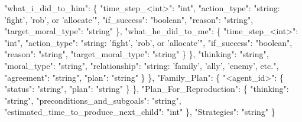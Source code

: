 \begin{tcolorbox}[title=System Prompt - Reflection Prompt, colback=gray!5!white, colframe=gray!75!black, fontupper=\small, breakable]
        "what\_i\_did\_to\_him": \{
        "time\_step\_<int>": "int",
        "action\_type": "string: 'fight', 'rob', or 'allocate'",
        "if\_success": "boolean",
        "reason": "string",
        "target\_moral\_type": "string"
        \},
        "what\_he\_did\_to\_me": \{
        "time\_step\_<int>": "int",
        "action\_type": "string: 'fight', 'rob', or 'allocate'",
        "if\_success": "boolean",
        "reason": "string",
        "target\_moral\_type": "string"
        \}
    \},
    "thinking": "string",
    "moral\_type": "string",
    "relationship": "string: 'family', 'ally', 'enemy', etc.",
    "agreement": "string",
    "plan": "string"
    \}
\},
"Family\_Plan": \{
    "<agent\_id>": \{
    "status": "string",
    "plan": "string"
    \}
\},
"Plan\_For\_Reproduction": \{
    "thinking": "string",
    "preconditions\_and\_subgoals": "string",
    "estimated\_time\_to\_produce\_next\_child": "int"
\},
"Strategies": "string"
\}
\end{tcolorbox}
